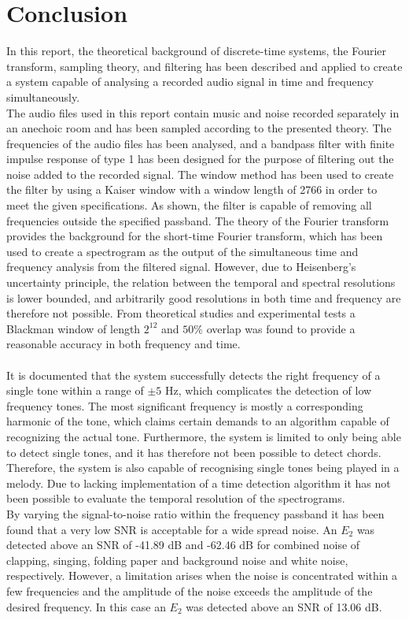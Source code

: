 \chapter{Conclusion}
In this report, the theoretical background of discrete-time systems, the Fourier transform, sampling theory, and filtering has been described and applied to create a system capable of analysing a recorded audio signal in time and frequency simultaneously.
\\
The audio files used in this report contain music and noise recorded separately in an anechoic room and has been sampled according to the presented theory. The frequencies of the audio files has been analysed, and a bandpass filter with finite impulse response of type 1 has been designed for the purpose of filtering out the noise added to the recorded signal. The window method has been used to create the filter by using a Kaiser window with a window length of 2766 in order to meet the given specifications. As shown, the filter is capable of removing all frequencies outside the specified passband. The theory of the Fourier transform provides the background for the short-time Fourier transform, which has been used to create a spectrogram as the output of the simultaneous time and frequency analysis from the filtered signal. However, due to Heisenberg's uncertainty principle, the relation between the temporal and spectral resolutions is lower bounded, and arbitrarily good resolutions in both time and frequency are therefore not possible. From theoretical studies and experimental tests a Blackman window of length $2^{12}$ and $50\%$ overlap was found to provide a reasonable accuracy in both frequency and time.
\\ \\
It is documented that the system successfully detects the right frequency of a single tone within a range of $\pm 5$ Hz, which complicates the detection of low frequency tones. The most significant frequency is mostly a corresponding harmonic of the tone, which claims certain demands to an algorithm capable of recognizing the actual tone. Furthermore, the system is limited to only being able to detect single tones, and it has therefore not been possible to detect chords. Therefore, the system is also capable of recognising single tones being played in a melody. Due to lacking implementation of a time detection algorithm it has not been possible to evaluate the temporal resolution of the spectrograms.
\\
By varying the signal-to-noise ratio within the frequency  passband it has been found that a very low SNR is acceptable for a wide spread noise. An $E_2$ was detected above an SNR of -41.89 dB and -62.46 dB for combined noise of clapping, singing, folding paper and background noise and white noise, respectively. However, a limitation arises when the noise is concentrated within a few frequencies and the amplitude of the noise exceeds the amplitude of the desired frequency. In this case an $E_2$ was detected above an SNR of 13.06 dB.
